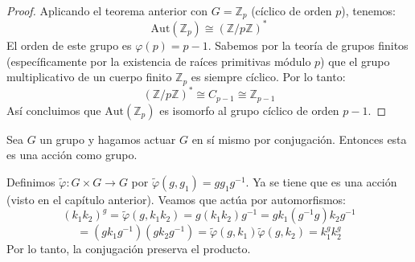 
\begin{proof}
    Aplicando el teorema anterior con $G = \mathbb{Z}_p$ (cíclico de orden $p$), tenemos:
    \begin{equation*}
        \text{Aut}(\mathbb{Z}_p) \cong (\mathbb{Z}/p\mathbb{Z})^*
    \end{equation*}
    El orden de este grupo es $\varphi(p) = p-1$.
    Sabemos por la teoría de grupos finitos (específicamente por la existencia de raíces primitivas módulo $p$) que el grupo multiplicativo de un cuerpo finito $\mathbb{Z}_p$ es siempre cíclico.
    Por lo tanto:
    \begin{equation*}
        (\mathbb{Z}/p\mathbb{Z})^* \cong C_{p-1} \cong \mathbb{Z}_{p-1}
    \end{equation*}
    Así concluimos que $\text{Aut}(\mathbb{Z}_p)$ es isomorfo al grupo cíclico de orden $p-1$.
\end{proof}

\begin{eje}
    Sea $G$ un grupo y hagamos actuar $G$ en sí mismo por conjugación.
    Entonces esta es una acción como grupo.
    
    Definimos $\tilde{\varphi}: G \times G \to G$ por $\tilde{\varphi}(g, g_1) = g g_1 g^{-1}$.
    Ya se tiene que es una acción (visto en el capítulo anterior). Veamos que actúa por automorfismos:
    \begin{equation*}
        (k_1 k_2)^g = \tilde{\varphi}(g, k_1 k_2) = g (k_1 k_2) g^{-1} = g k_1 (g^{-1} g) k_2 g^{-1}
    \end{equation*}
    \begin{equation*}
        = (g k_1 g^{-1}) (g k_2 g^{-1}) = \tilde{\varphi}(g, k_1) \tilde{\varphi}(g, k_2) = k_1^g k_2^g
    \end{equation*}
    Por lo tanto, la conjugación preserva el producto.
\end{eje}


